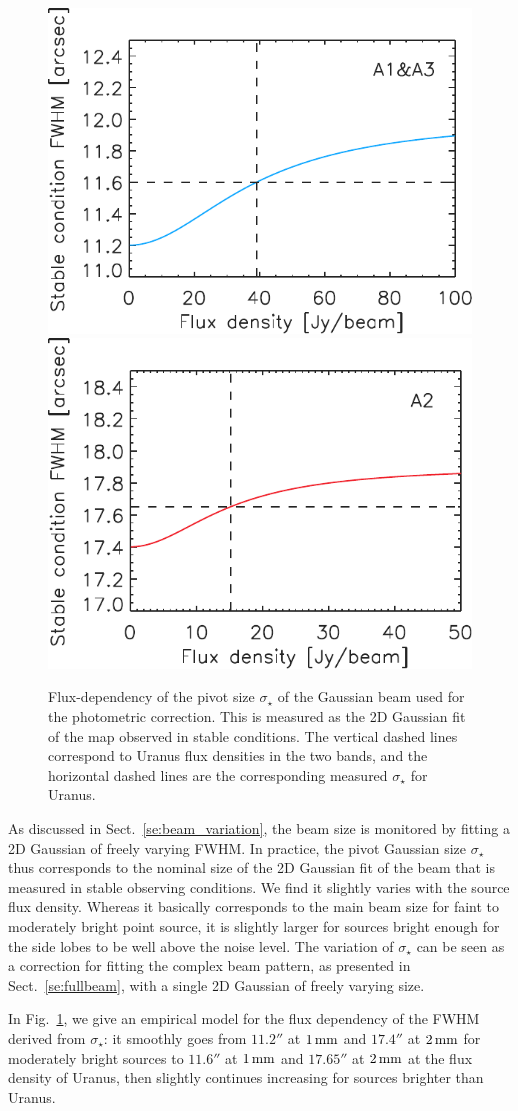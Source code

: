 \begin{figure}[ht!]
  \begin{center}
    \includegraphics[clip=true, trim={0, -0.3cm, -0.3cm, 0}, width=0.49\linewidth]{Figures/FWHM_stable_empiric_ref_1mm.pdf}
    \includegraphics[clip=true, trim={0, -0.3cm, -0.3cm, 0}, width=0.49\linewidth]{Figures/FWHM_stable_empiric_ref_a2.pdf}
    \caption[Photometric correction pivot Gaussian
      size]{Flux-dependency of the pivot size $\sigma_\star$ of the
      Gaussian beam used for the photometric correction. This is measured as the 2D
      Gaussian fit of the map observed in stable conditions.
      The vertical dashed lines correspond to Uranus flux densities in
      the two bands, and the horizontal dashed lines are the
      corresponding measured
      $\sigma_\star$ for Uranus.}
    \label{fig:sigma_stable_vs_flux}
  \end{center}
\end{figure}

As discussed in Sect.~\ref{se:beam_variation}, the beam size is
monitored by fitting a 2D Gaussian of freely varying FWHM.
In practice, the pivot Gaussian size $\sigma_{\star}$ thus corresponds
to the nominal size of the 2D Gaussian fit of the beam that is
measured in stable observing conditions. We find it slightly varies with the
source flux density. Whereas it basically corresponds to the main beam
size for faint to moderately bright point source, it is slightly
larger for sources bright enough for the side lobes to be well above
the noise level. The variation of $\sigma_{\star}$ can be seen as a
correction for fitting the complex beam pattern, as presented in
Sect.~\ref{se:fullbeam}, with a single 2D Gaussian of freely varying
size.

In Fig.~\ref{fig:sigma_stable_vs_flux}, we give an
empirical model for the flux dependency of the FWHM derived from
$\sigma_{\star}$: it
smoothly goes from $11.2''$ at $1\,\rm{mm}$ and $17.4''$ at $2\,\rm{mm}$ for
moderately bright sources to $11.6''$ at $1\,\rm{mm}$ and $17.65''$ at
$2\,\rm{mm}$ at the flux density of Uranus,
then slightly continues increasing for sources brighter than Uranus.
